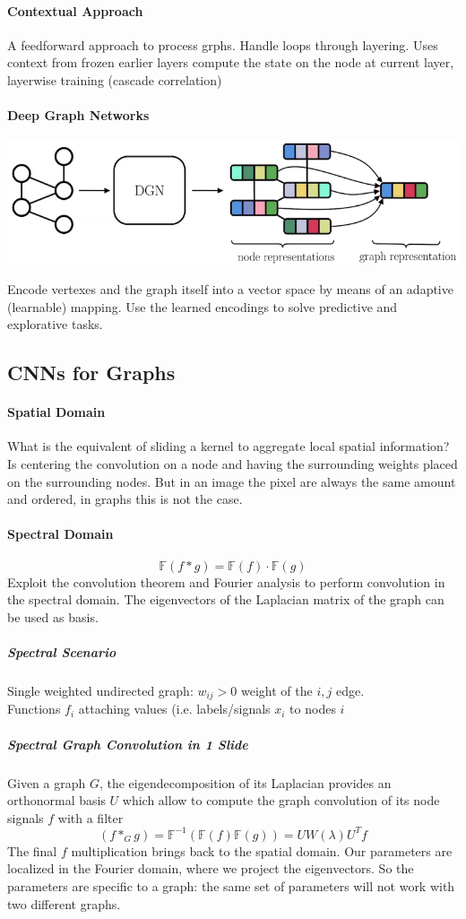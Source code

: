 \documentclass[10pt]{report}
\begin{document}
\paragraph{Contextual Approach} A feedforward approach to process grphs. Handle loops through layering. Uses context from frozen earlier layers compute the state on the node at current layer, layerwise training (cascade correlation) %
\paragraph{Deep Graph Networks}
\begin{center}
	\includegraphics[scale=0.5]{195.png}
\end{center}
Encode vertexes and the graph itself into a vector space by means of an adaptive (learnable) mapping. Use the learned encodings to solve predictive and explorative tasks.
\subsection{CNNs for Graphs}
\paragraph{Spatial Domain} What is the equivalent of sliding a kernel to aggregate local spatial information? Is centering the convolution on a node and having the surrounding weights placed on the surrounding nodes. But in an image the pixel are always the same amount and ordered, in graphs this is not the case.
\paragraph{Spectral Domain} $$\mathbb{F}(f*g) = \mathbb{F}(f)\cdot
 \mathbb{F}(g)$$
Exploit the convolution theorem and Fourier analysis to perform convolution in the spectral domain. The eigenvectors of the Laplacian matrix of the graph can be used as basis.
\subparagraph{Spectral Scenario} Single weighted undirected graph: $w_{ij}>0$ weight of the $i,j$ edge.\\
Functions $f_i$ attaching values (i.e. labels/signals $x_i$ to nodes $i$ %
\subparagraph{Spectral Graph Convolution in 1 Slide} Given a graph $G$, the eigendecomposition of its Laplacian provides an orthonormal basis $U$ which allow to compute the graph convolution of its node signals $f$ with a filter 
$$(f*_G g) = \mathbb{F}^{-1}(\mathbb{F}(f)\mathbb{F}(g)) = UW(\lambda)U^Tf$$
The final $f$ multiplication brings back to the spatial domain. Our parameters are localized in the Fourier domain, where we project the eigenvectors. So the parameters are specific to a graph: the same set of parameters will not work with two different graphs.
\end{document}

